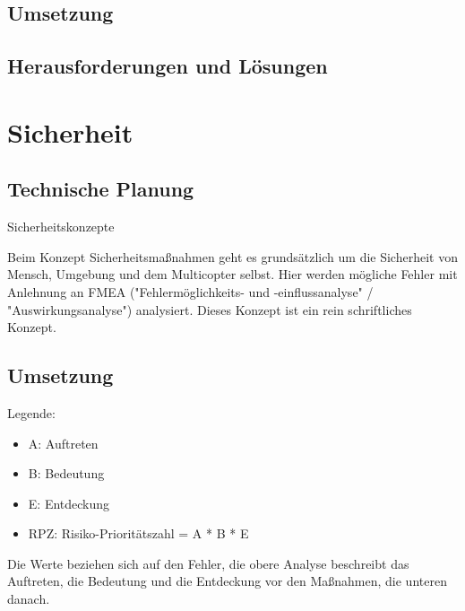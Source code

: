   \subsection{Umsetzung}

  \subsection{Herausforderungen und Lösungen}

\section{Sicherheit}

  \subsection{Technische Planung}

Sicherheitskonzepte

Beim Konzept Sicherheitsmaßnahmen geht es grundsätzlich um die Sicherheit von Mensch, Umgebung und dem Multicopter selbst. Hier werden mögliche Fehler mit Anlehnung an FMEA ("Fehlermöglichkeits- und -einflussanalyse" / "Auswirkungsanalyse") analysiert. Dieses Konzept ist ein rein schriftliches Konzept.

  \subsection{Umsetzung}

    Legende:
    \begin{itemize}
    \item A: Auftreten
    \item B: Bedeutung
    \item E: Entdeckung
    \item RPZ: Risiko-Prioritätszahl = A * B * E
    \end{itemize}

    Die Werte beziehen sich auf den Fehler, die obere Analyse beschreibt das Auftreten, die Bedeutung und die Entdeckung vor den Maßnahmen, die unteren danach.

